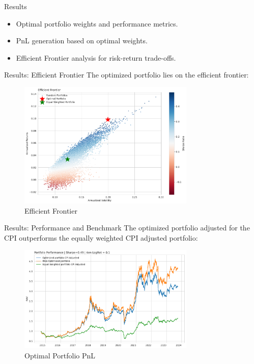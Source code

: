 \documentclass{beamer}
\begin{document}
\begin{frame}{Results}
  \begin{itemize}
    \item Optimal portfolio weights and performance metrics.
    \item PnL generation based on optimal weights.
    \item Efficient Frontier analysis for risk-return trade-offs.
  \end{itemize}
\end{frame}

\begin{frame}{Results: Efficient Frontier}
The optimized portfolio lies on the efficient frontier:
  \begin{figure}
    \centering
    \includegraphics[width=0.75\textwidth]{paper/figure/Optimal_PF.pdf}
    \caption{Efficient Frontier}
  \end{figure}
\end{frame}

\begin{frame}{Results: Performance and Benchmark}
The optimized portfolio adjusted for the CPI outperforms the equally weighted CPI adjusted portfolio:
  \begin{figure}
    \centering
    \includegraphics[width=0.75\textwidth]{paper/figure/PNL.pdf}
    \caption{Optimal Portfolio PnL}
  \end{figure}
\end{frame}
\end{document}
